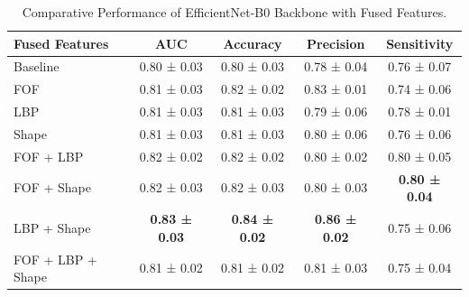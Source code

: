 \begin{table}[htb]
  \centering
  \caption{Comparative Performance of EfficientNet-B0 Backbone with Fused Features.}
  \label{tab:effnetB0_fusion_metrics}
  \begin{tabular}{@{} l  c  c  c  c @{}}
    \toprule
    \textbf{Fused Features} 
      & \textbf{AUC} 
      & \textbf{Accuracy} 
      & \textbf{Precision} 
      & \textbf{Sensitivity} \\
    \midrule
    Baseline                & 0.80 ± 0.03 & 0.80 ± 0.03 & 0.78 ± 0.04 & 0.76 ± 0.07 \\
    \hline \addlinespace
    FOF                     & 0.81 ± 0.03 & 0.82 ± 0.02 & 0.83 ± 0.01 & 0.74 ± 0.06 \\
    LBP                     & 0.81 ± 0.03 & 0.81 ± 0.03 & 0.79 ± 0.06 & 0.78 ± 0.01 \\
    Shape                   & 0.81 ± 0.03 & 0.81 ± 0.03 & 0.80 ± 0.06 & 0.76 ± 0.06\\ 
    \hline \addlinespace
    FOF + LBP               & 0.82 ± 0.02 & 0.82 ± 0.02 & 0.80 ± 0.02 & 0.80 ± 0.05 \\
    FOF + Shape             & 0.82 ± 0.03 & 0.82 ± 0.03 & 0.80 ± 0.03 & \textbf{0.80 ± 0.04} \\
    LBP + Shape             & \textbf{0.83 ± 0.03} & \textbf{0.84 ± 0.02} & \textbf{0.86 ± 0.02} & 0.75 ± 0.06 \\
    \hline \addlinespace
    FOF + LBP + Shape       & 0.81 ± 0.02 & 0.81 ± 0.02 & 0.81 ± 0.03 & 0.75 ± 0.04 \\
    \bottomrule
  \end{tabular}
\end{table}

